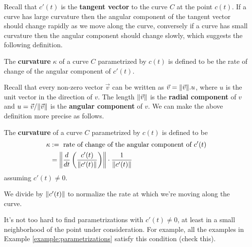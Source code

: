 Recall that $ c'(t)$ is the \textbf{tangent vector} to the curve $ C$ at the point $ c(t)$. If a curve has large curvature then the angular component of the tangent vector should change rapidly as we move along the curve, conversely if a curve has small curvature then the angular component should change slowly, which suggests the following definition.

\begin{definition}
	The \textbf{curvature} $ \kappa$ of a curve $ C$ parametrized by $ c(t)$ is defined to be the rate of change of the angular component of $ c'(t)$.
\end{definition}
Recall that every non-zero vector $ \vec{v}$ can be written as $ \vec{v} = \lVert \vec{v} \rVert . u$, where $ u$ is the unit vector in the direction of $ v$. The length $ \lVert \vec{v} \rVert$ is the \textbf{radial component} of $ v$ and $ u = \vec{v} / \lVert \vec{v} \rVert$ is the \textbf{angular component} of $ v$. We can make the above definition more precise as follows.
\begin{definition}
	The \textbf{curvature} of a curve $ C$ parametrized by $ c(t)$ is defined to be
	\begin{align*}
		\kappa
		&:= \mbox{ rate of change of the angular component of } c'(t) \\
		&= \left \lVert \dfrac{d}{dt} \left( \dfrac{c'(t)}{\lVert c'(t) \rVert}\right) \right \rVert \cdot \dfrac{1}{\lVert c'(t) \rVert}
	\end{align*}
	assuming $c'(t) \neq 0$.
\end{definition}
We divide by $\lVert c'(t) \rVert$ to normalize the rate at which we're moving along the curve.
\begin{remark}
	It's not too hard to find parametrizations with $c'(t) \neq 0$, at least in a small neighborhood of the point under consideration. For example, all the examples in Example \ref{example:parametrizations} satisfy this condition (check this).
\end{remark}

